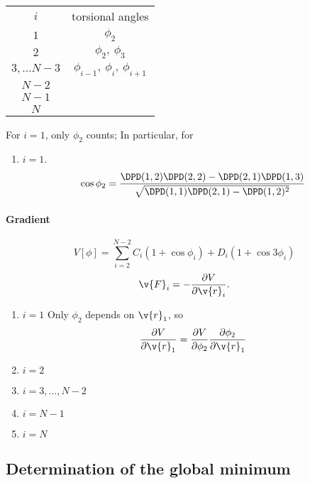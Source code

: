 \begin{tabular}[ht]{cc}
  $i$ 	& 	torsional angles \\
  $1$	&	$\phi_2$ \\
  $2$	&	$\phi_2,\ \phi_3$ \\
  $3,\ldots N-3$	&	$\phi_{i-1},\ \phi_i,\ \phi_{i+1}$ \\
  $N-2$		&	\\
  $N-1$		&	\\
  $N$		&	\\
\end{tabular}
For $i=1$, only $\phi_2$ counts;
In particular, for 
\begin{enumerate}
  \item $i=1$. 
    \begin{equation}
      \cos\phi_2=\frac
      {\DPD(1,2)\DPD(2,2)-\DPD(2,1)\DPD(1,3)}
      {\sqrt{\DPD(1,1)\DPD(2,1)-\DPD(1,2)^2}}
    \end{equation}
\end{enumerate}

\paragraph{Gradient}

\begin{equation}
  V[\phi]=\sum_{i=2}^{N-2}C_i(1+\cos{\phi_i})+D_i(1+\cos{3\phi_i})
\end{equation}
\begin{equation}
  \v{F}_i=-\frac{\partial V}{\partial \v{r}_i}.
\end{equation}
\begin{enumerate}
  \item $i=1$ Only $\phi_2$ depends on $\v{r}_1$, so
    \begin{equation}
      \frac{\partial V}{\partial \v{r}_1}=
      {\frac{\partial V}{\partial\phi_2}}
      {\frac{\partial\phi_2}{\partial\v{r}_1}}
    \end{equation}
  \item $i=2$
  \item $i=3,\ldots,N-2$
  \item $i=N-1$
  \item $i=N$
\end{enumerate}

\subsection{Determination of the global minimum}


